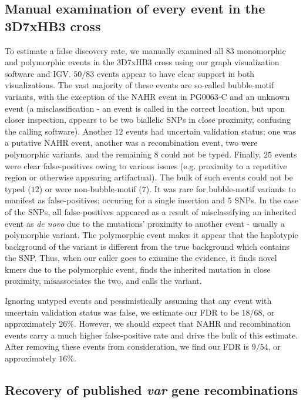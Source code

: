 \subsection{Manual examination of every event in the 3D7xHB3 cross}

To estimate a false discovery rate, we manually examined all $83$ monomorphic and polymorphic events in the 3D7xHB3 cross using our graph visualization software and IGV.  $50/83$ events appear to have clear support in both visualizations.  The vast majority of these events are so-called bubble-motif variants, with the exception of the NAHR event in PG0063-C and an unknown event (a misclassification - an event is called in the correct location, but upon closer inspection, appears to be two biallelic SNPs in close proximity, confusing the calling software).  Another $12$ events had uncertain validation status; one was a putative NAHR event, another was a recombination event, two were polymorphic variants, and the remaining $8$ could not be typed.  Finally, $25$ events were clear false-positives owing to various issues (e.g. proximity to a repetitive region or otherwise appearing artifactual).  The bulk of such events could not be typed ($12$) or were non-bubble-motif ($7$).  It was rare for bubble-motif variants to manifest as false-positives; occuring for a single insertion and $5$ SNPs.  In the case of the SNPs, all false-positives appeared as a result of misclassifying an inherited event as \textit{de novo} due to the mutations' proximity to another event - usually a polymorphic variant.  The polymorphic event makes it appear that the haplotypic background of the variant is different from the true background which contains the SNP.  Thus, when our caller goes to examine the evidence, it finds novel kmers due to the polymorphic event, finds the inherited mutation in close proximity, misassociates the two, and calls the variant.

Ignoring untyped events and pessimistically assuming that any event with uncertain validation status was false, we estimate our FDR to be $18/68$, or approximately $26\%$.  However, we should expect that NAHR and recombination events carry a much higher false-positive rate and drive the bulk of this estimate.  After removing these events from consideration, we find our FDR is $9/54$, or approximately $16\%$.

\subsection{Recovery of published \textit{var} gene recombinations}

